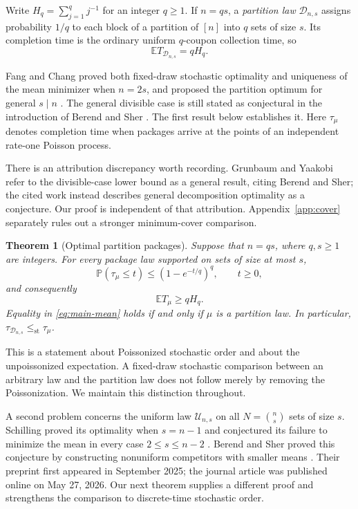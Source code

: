 \documentclass[11pt]{article}
\numberwithin{equation}{section}
\newtheorem{theorem}{Theorem}[section]
\theoremstyle{remark}
\newcommand{\Pp}{\mathbb P}
\newcommand{\E}{\mathbb E}
\newcommand{\1}{\mathbf 1}
\newcommand{\st}{\leq_{\mathrm{st}}}
\newcommand{\U}{\mathcal U}
\newcommand{\D}{\mathcal D}
\begin{document}
Write $H_q=\sum_{j=1}^q j^{-1}$ for an integer $q\geq1$. If $n=qs$, a \emph{partition law} $\D_{n,s}$ assigns probability $1/q$ to each block of a partition of $[n]$ into $q$ sets of size $s$. Its completion time is the ordinary uniform $q$-coupon collection time, so
\begin{equation}\label{eq:partition-mean}
 \E T_{\D_{n,s}}=qH_q.
\end{equation}

Fang and Chang proved both fixed-draw stochastic optimality and uniqueness of the mean minimizer when $n=2s$, and proposed the partition optimum for general $s\mid n$ \cite[Theorem~2 and Corollary~3]{FangChang}. The general divisible case is still stated as conjectural in the introduction of Berend and Sher \cite{BerendSher}. The first result below establishes it. Here $\tau_\mu$ denotes completion time when packages arrive at the points of an independent rate-one Poisson process.

There is an attribution discrepancy worth recording. Grunbaum and Yaakobi \cite[Remark~2]{GrunbaumYaakobi} refer to the divisible-case lower bound as a general result, citing Berend and Sher; the cited work instead describes general decomposition optimality as a conjecture. Our proof is independent of that attribution. Appendix~\ref{app:cover} separately rules out a stronger minimum-cover comparison.

\begin{theorem}[Optimal partition packages]\label{thm:main-partition}
Suppose that $n=qs$, where $q,s\geq1$ are integers. For every package law supported on sets of size at most $s$,
\begin{equation}\label{eq:main-cdf}
 \Pp(\tau_\mu\leq t)\leq (1-e^{-t/q})^q,
 \qquad t\geq0,
\end{equation}
and consequently
\begin{equation}\label{eq:main-mean}
 \E T_\mu\geq qH_q.
\end{equation}
Equality in \eqref{eq:main-mean} holds if and only if $\mu$ is a partition law. In particular,
$\tau_{\D_{n,s}}\st\tau_\mu$.
\end{theorem}

This is a statement about Poissonized stochastic order and about the unpoissonized expectation. A fixed-draw stochastic comparison between an arbitrary law and the partition law does not follow merely by removing the Poissonization. We maintain this distinction throughout.

A second problem concerns the uniform law $\U_{n,s}$ on all $N=\binom ns$ sets of size $s$. Schilling proved its optimality when $s=n-1$ and conjectured its failure to minimize the mean in every case $2\leq s\leq n-2$ \cite{Schilling}. Berend and Sher proved this conjecture by constructing nonuniform competitors with smaller means \cite{BerendSher}. Their preprint first appeared in September 2025; the journal article was published online on May 27, 2026. Our next theorem supplies a different proof and strengthens the comparison to discrete-time stochastic order.
\end{document}
